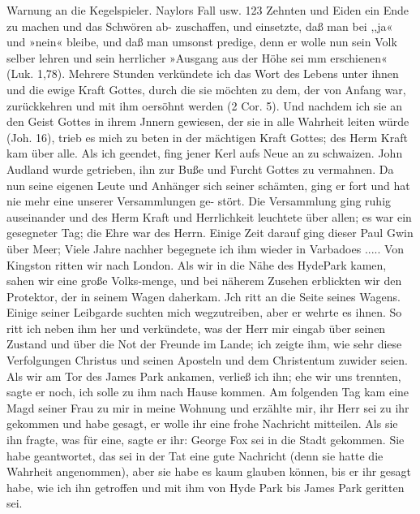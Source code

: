 Warnung an die Kegelspieler. Naylors Fall usw. 123
Zehnten und Eiden ein Ende zu machen und das Schwören ab-
zuschaffen, und einsetzte, daß man bei ,,ja« und »nein« bleibe,
und daß man umsonst predige, denn er wolle nun sein Volk
selber lehren und sein herrlicher »Ausgang aus der Höhe sei mm
erschienen« (Luk. 1,78). Mehrere Stunden verkündete ich das
Wort des Lebens unter ihnen und die ewige Kraft Gottes, durch
die sie möchten zu dem, der von Anfang war, zurückkehren und
mit ihm oersöhnt werden (2 Cor. 5). Und nachdem ich sie an den
Geist Gottes in ihrem Jnnern gewiesen, der sie in alle Wahrheit
leiten würde (Joh. 16), trieb es mich zu beten in der mächtigen
Kraft Gottes; des Herm Kraft kam über alle. Als ich geendet,
fing jener Kerl aufs Neue an zu schwaizen. John Audland
wurde getrieben, ihn zur Buße und Furcht Gottes zu vermahnen.
Da nun seine eigenen Leute und Anhänger sich seiner schämten,
ging er fort und hat nie mehr eine unserer Versammlungen ge-
stört. Die Versammlung ging ruhig auseinander und des Herm
Kraft und Herrlichkeit leuchtete über allen; es war ein gesegneter
Tag; die Ehre war des Herrn. Einige Zeit darauf ging dieser
Paul Gwin über Meer; Viele Jahre nachher begegnete ich ihm
wieder in Varbadoes .....
Von Kingston ritten wir nach London. Als wir in die Nähe
des HydePark kamen, sahen wir eine große Volks-menge, und bei
näherem Zusehen erblickten wir den Protektor, der in seinem
Wagen daherkam. Jch ritt an die Seite seines Wagens. Einige
seiner Leibgarde suchten mich wegzutreiben, aber er wehrte es
ihnen. So ritt ich neben ihm her und verkündete, was der Herr
mir eingab über seinen Zustand und über die Not der Freunde
im Lande; ich zeigte ihm, wie sehr diese Verfolgungen Christus
und seinen Aposteln und dem Christentum zuwider seien. Als wir
am Tor des James Park ankamen, verließ ich ihn; ehe wir uns
trennten, sagte er noch, ich solle zu ihm nach Hause kommen.
Am folgenden Tag kam eine Magd seiner Frau zu mir in meine
Wohnung und erzählte mir, ihr Herr sei zu ihr gekommen und
habe gesagt, er wolle ihr eine frohe Nachricht mitteilen. Als sie
ihn fragte, was für eine, sagte er ihr: George Fox sei in die
Stadt gekommen. Sie habe geantwortet, das sei in der Tat eine
gute Nachricht (denn sie hatte die Wahrheit angenommen), aber sie
habe es kaum glauben können, bis er ihr gesagt habe, wie ich ihn
getroffen und mit ihm von Hyde Park bis James Park geritten sei.



